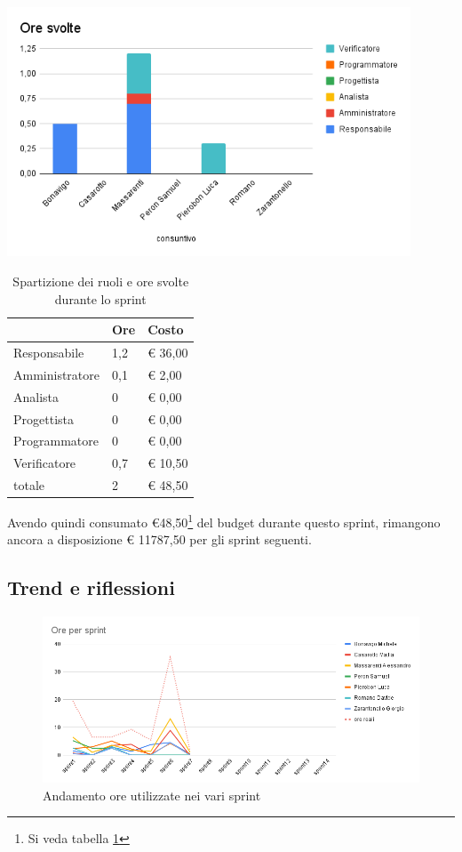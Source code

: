 \begin{center}
\includegraphics[width=12cm]{img/ore-svolte.png}
\end{center}

\begin{table}[ht]
    \begin{tabularx}{\linewidth}{X|l|l}
    \rowcolor{gray!30}& Ore & Costo \\
    \hline
    
    Responsabile & 1,2 & € 36,00 \\
    \rowcolor{gray!10}Amministratore & 0,1 & € 2,00 \\
    Analista & 0 & € 0,00 \\
    \rowcolor{gray!10}Progettista & 0 & € 0,00 \\
    Programmatore & 0 & € 0,00 \\
    \rowcolor{gray!10}Verificatore & 0,7 &€ 10,50 \\
    totale & 2 & € 48,50 \\
    \end{tabularx}
    \caption{\label{costi-ruolo}Spartizione dei ruoli e ore svolte durante lo sprint}
\end{table}


Avendo quindi consumato €48,50\footnote{Si veda tabella \ref{costi-ruolo}} del budget durante questo sprint, rimangono ancora a disposizione € 11787,50 per gli sprint seguenti.

\subsection{Trend e riflessioni}

\begin{figure}[ht]
    \includegraphics[width=\linewidth]{img/andamento.png}
    \caption{Andamento ore utilizzate nei vari sprint}\label{img:andamento}
\end{figure}

